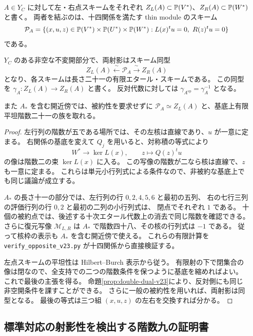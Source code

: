 $A\in Y_C$ に対して左・右点スキームをそれぞれ
$Z_L(A)\subset\mathbb P(V^*)$、$Z_R(A)\subset\mathbb P(W^*)$ と書く。
両者を結ぶのは、十四関係を満たす thin module のスキーム
\[
 \mathcal P_A=
 \{(x,u,z)\in\mathbb P(V^*)\times\mathbb P(U^*)\times\mathbb P(W^*):
       L(x)^tu=0,\ R(z)^tu=0\}
\]
である。

\begin{lemma}[左右の標準対応]\label{lem:canonical-point-matching-v23}
$Y_C$ のある非空な不変開部分で、両射影はスキーム同型
\[
 Z_L(A)\xleftarrow{\ \sim\ }\mathcal P_A
             \xrightarrow{\ \sim\ }Z_R(A)
\]
となり、各スキームは長さ二十一の有限エタール・スキームである。
この同型を $\gamma_A:Z_L(A)\to Z_R(A)$ と書く。
反対代数に対しては $\gamma_{A^{\mathrm{op}}}=\gamma_A^{-1}$ となる。

また $A_*$ を含む開近傍では、被約性を要求せずに
$\mathcal P_A\simeq Z_L(A)$ と、基底上有限平坦階数二十一の族を取れる。
\end{lemma}
\begin{proof}
左行列の階数が五である場所では、その左核は直線であり、$u$ が一意に定まる。
右関係の基底を変えて $Q_j$ を用いると、対称積の等式により
\[
 W^*\longrightarrow\ker L(x),\qquad z\longmapsto Q(z)^tu
\]
の像は階数二の束 $\ker L(x)$ に入る。
この写像の階数が二なら核は直線で、$z$ も一意に定まる。
これらは単元小行列式による条件なので、非被約な基底上でも同じ議論が成立する。

$A_*$ の長さ十一の部分では、左行列の行 $0,2,4,5,6$ と最初の五列、
右の七行三列の評価行列の行 $0,2$ と最初の二列の小行列式は、
閉点でそれぞれ $1$ である。
十個の被約点では、後述する十次エタール代数上の消去で同じ階数を確認できる。
さらに復元写像 $\mathcal M_{L,R}$ は $A_*$ で階数四十八、その核の行列式は $-1$ である。
従って核枠の表示も $A_*$ を含む開近傍で使える。
これらの有限計算を \nolinkurl{verify_opposite_v23.py} が十四関係から直接検証する。

左点スキームの平坦性は Hilbert--Burch 表示から従う。
有限射の下で閉集合の像は閉なので、全支持での二つの階数条件を保つように基底を縮めればよい。
これで最後の主張を得る。
命題\ref{prop:double-dual-v23}により、反対側にも同じ非空開条件を課すことができる。
さらに一般の被約性を用いれば、両射影は同型となる。
最後の等式は三つ組 $(x,u,z)$ の左右を交換すれば分かる。
\end{proof}

\subsection{標準対応の射影性を検出する階数九の証明書}

